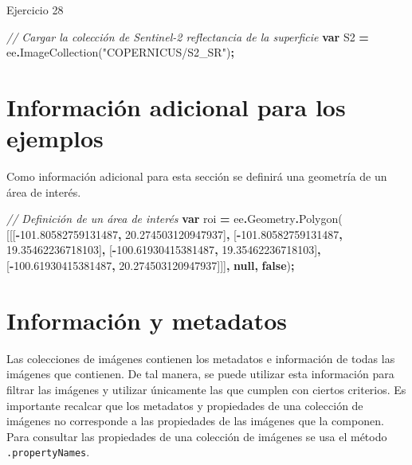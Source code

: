 \documentclass[
  12pt,
  letterpaper,
  twoside]{book}
\newenvironment{Shaded}{\begin{snugshade}}{\end{snugshade}}
\newcommand{\AttributeTok}[1]{\textcolor[rgb]{0.77,0.63,0.00}{#1}}
\newcommand{\CommentTok}[1]{\textcolor[rgb]{0.56,0.35,0.01}{\textit{#1}}}
\newcommand{\FloatTok}[1]{\textcolor[rgb]{0.00,0.00,0.81}{#1}}
\newcommand{\FunctionTok}[1]{\textcolor[rgb]{0.00,0.00,0.00}{#1}}
\newcommand{\KeywordTok}[1]{\textcolor[rgb]{0.13,0.29,0.53}{\textbf{#1}}}
\newcommand{\NormalTok}[1]{#1}
\newcommand{\OperatorTok}[1]{\textcolor[rgb]{0.81,0.36,0.00}{\textbf{#1}}}
\newcommand{\StringTok}[1]{\textcolor[rgb]{0.31,0.60,0.02}{#1}}
\begin{document}
Ejercicio 28

\begin{Shaded}
\begin{Highlighting}[]
\CommentTok{// Cargar la colección de Sentinel{-}2 reflectancia de la superficie}
\KeywordTok{var}\NormalTok{ S2 }\OperatorTok{=}\NormalTok{ ee}\OperatorTok{.}\FunctionTok{ImageCollection}\NormalTok{(}\StringTok{"COPERNICUS/S2\_SR"}\NormalTok{)}\OperatorTok{;}
\end{Highlighting}
\end{Shaded}

\hypertarget{informaciuxf3n-adicional-para-los-ejemplos-1}{%
\section{Información adicional para los ejemplos}\label{informaciuxf3n-adicional-para-los-ejemplos-1}}

Como información adicional para esta sección se definirá una geometría de un área de interés.

\begin{Shaded}
\begin{Highlighting}[]
\CommentTok{// Definición de un área de interés}
\KeywordTok{var}\NormalTok{ roi }\OperatorTok{=}\NormalTok{ ee}\OperatorTok{.}\AttributeTok{Geometry}\OperatorTok{.}\FunctionTok{Polygon}\NormalTok{(}
\NormalTok{        [[[}\OperatorTok{{-}}\FloatTok{101.80582759131487}\OperatorTok{,} \FloatTok{20.274503120947937}\NormalTok{]}\OperatorTok{,}
\NormalTok{          [}\OperatorTok{{-}}\FloatTok{101.80582759131487}\OperatorTok{,} \FloatTok{19.35462236718103}\NormalTok{]}\OperatorTok{,}
\NormalTok{          [}\OperatorTok{{-}}\FloatTok{100.61930415381487}\OperatorTok{,} \FloatTok{19.35462236718103}\NormalTok{]}\OperatorTok{,}
\NormalTok{          [}\OperatorTok{{-}}\FloatTok{100.61930415381487}\OperatorTok{,} \FloatTok{20.274503120947937}\NormalTok{]]]}\OperatorTok{,} \KeywordTok{null}\OperatorTok{,} \KeywordTok{false}\NormalTok{)}\OperatorTok{;}
\end{Highlighting}
\end{Shaded}

\hypertarget{informaciuxf3n-y-metadatos-4}{%
\section{Información y metadatos}\label{informaciuxf3n-y-metadatos-4}}

Las colecciones de imágenes contienen los metadatos e información de todas las imágenes que contienen. De tal manera, se puede utilizar esta información para filtrar las imágenes y utilizar únicamente las que cumplen con ciertos criterios. Es importante recalcar que los metadatos y propiedades de una colección de imágenes no corresponde a las propiedades de las imágenes que la componen. Para consultar las propiedades de una colección de imágenes se usa el método \texttt{.propertyNames}.
\end{document}
